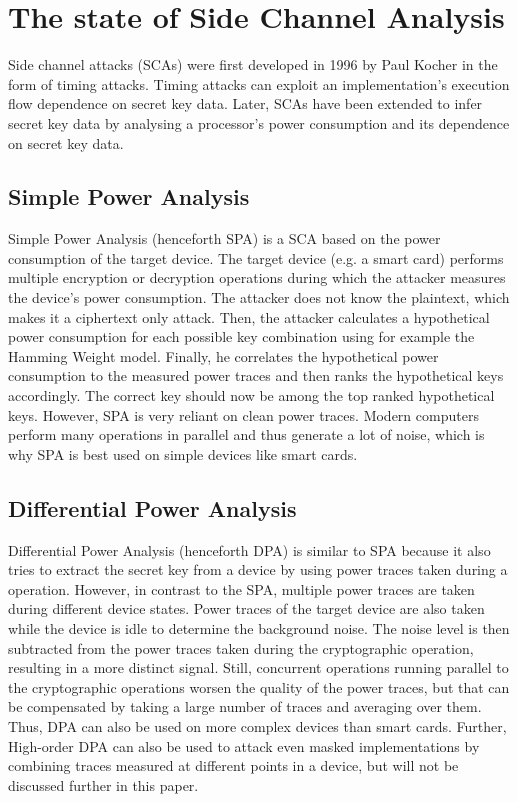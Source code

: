 \documentclass[journal]{IEEEtran}
\begin{document}
\section{The state of Side Channel Analysis}
Side channel attacks (SCAs) were first developed in 1996 by Paul Kocher \cite{first-sca:kocher} in the form of timing attacks. Timing attacks can exploit an implementation's execution flow dependence on secret key data. Later, SCAs have been extended to infer secret key data by analysing a processor's power consumption and its dependence on secret key data. 

\subsection{Simple Power Analysis}
Simple Power Analysis (henceforth SPA) is a SCA based on the power consumption of the target device. The target device (e.g. a smart card) performs multiple encryption or decryption operations during which the attacker measures the device's power consumption. The attacker does not know the plaintext, which makes it a ciphertext only attack. Then, the attacker calculates a hypothetical power consumption for each possible key combination using for example the Hamming Weight model. Finally, he correlates the hypothetical power consumption to the measured power traces and then ranks the hypothetical keys accordingly. The correct key should now be among the top ranked hypothetical keys. However, SPA is very reliant on clean power traces. Modern computers perform many operations in parallel and thus generate a lot of noise, which is why SPA is best used on simple devices like smart cards. 

\subsection{Differential Power Analysis}
Differential Power Analysis (henceforth DPA) is similar to SPA because it also tries to extract the secret key from a device by using power traces taken during a operation. However, in contrast to the SPA, multiple power traces are taken during different device states. Power traces of the target device are also taken while the device is idle to determine the background noise. The noise level is then subtracted from the power traces taken during the cryptographic operation, resulting in a more distinct signal. Still, concurrent operations running parallel to the cryptographic operations worsen the quality of the power traces, but that can be compensated by taking a large number of traces and averaging over them. Thus, DPA can also be used on more complex devices than smart cards. Further, High-order DPA can also be used to attack even masked implementations by combining traces measured at different points in a device, but will not be discussed further in this paper.
\end{document}
